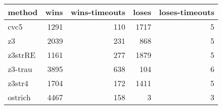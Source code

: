 \begin{tabular}{lrrrr}
\hline
 method   &   wins &   wins-timeouts &   loses &   loses-timeouts \\
\hline
 cvc5     &   1291 &             110 &    1717 &                5 \\
 z3       &   2039 &             231 &     868 &                5 \\
 z3strRE  &   1161 &             277 &    1879 &                5 \\
 z3-trau  &   3895 &             638 &     104 &                6 \\
 z3str4   &   1704 &             172 &    1411 &                5 \\
 ostrich  &   4467 &             158 &       3 &                3 \\
\hline
\end{tabular}
